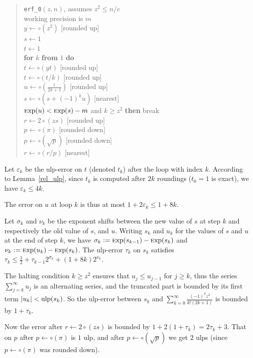 \documentclass[12pt]{amsart}
\def\q{\hspace*{5mm}}
\def\Exp{{\rm \textsc exp}}
\begin{document}
\begin{quote}
\verb|erf_0|$(z, n)$, assumes $z^2 \le n/e$ \\
working precision is $m$ \\
$y \leftarrow \circ (z^2)$ [rounded up] \\
$s \leftarrow 1$ \\
$t \leftarrow 1$ \\
{\bf for} $k$ {\bf from} $1$ {\bf do} \\
\q $t \leftarrow \circ (y t)$ [rounded up] \\
\q $t \leftarrow \circ (t/k)$ [rounded up] \\
\q $u \leftarrow \circ (\frac{t}{2k+1})$ [rounded up] \\
\q $s \leftarrow \circ (s + (-1)^k u)$ [nearest] \\
\q {\bf if} $\Exp(u) < \Exp(s) - m$ and $k \geq z^2$
        {\bf then} break \\
$r \leftarrow 2 \circ (z s)$ [rounded up] \\
$p \leftarrow \circ (\pi)$ [rounded down] \\
$p \leftarrow \circ (\sqrt{p})$ [rounded down] \\
$r \leftarrow \circ (r/p)$ [nearest]
\end{quote}

Let $\varepsilon_k$ be the ulp-error on $t$ (denoted $t_k$)
after the loop with index $k$.
According to Lemma~\ref{rel_ulp}, since $t_k$ is computed after $2k$
roundings ($t_0=1$ is exact), we have $\varepsilon_k \leq 4k$.

The error on $u$ at loop $k$ is thus at most
$1+2\varepsilon_k \leq 1+8k$.

Let $\sigma_k$ and $\nu_k$ be the exponent shifts between the new value of
$s$ at step $k$ and respectively the old value of $s$, and $u$.
Writing $s_k$ and $u_k$ for the values of $s$ and $u$ at the end of step $k$,
we have $\sigma_k := \Exp(s_{k-1}) - \Exp(s_k)$
and $\nu_k := \Exp(u_k) - \Exp(s_k)$.
The ulp-error $\tau_k$ on $s_k$ satisfies
$\tau_k \leq \frac{1}{2} + \tau_{k-1} 2^{\sigma_k} + (1+8k) 2^{\nu_k}$.

The halting condition $k \geq z^2$ ensures that $u_j \leq u_{j-1}$ for
$j \geq k$, thus the series $\sum_{j=k}^{\infty} u_j$ is an alternating series,
and the truncated part is bounded by its first term $|u_k| < {\rm ulp}(s_k)$.
So the ulp-error between $s_k$ and $\sum_{k=0}^{\infty} \frac{(-1)^k z^2}{k!
(2k+1)}$ is bounded by $1+\tau_k$.

Now the error after $r \leftarrow 2 \circ (z s)$ is bounded by
$1 + 2 (1+\tau_k) = 2 \tau_k + 3$.
That on $p$ after $p \leftarrow \circ (\pi)$ is $1$ ulp,
and after $p \leftarrow \circ (\sqrt{p})$ we get $2$ ulps
(since $p \leftarrow \circ (\pi)$ was rounded down).
\end{document}
